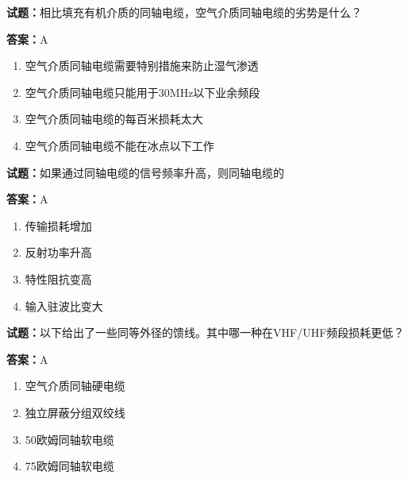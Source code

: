 \documentclass{ctexbook}
\begin{document}




\vspace{1em}

\textbf{试题：}相比填充有机介质的同轴电缆，空气介质同轴电缆的劣势是什么？ 

\textbf{答案：}A 

\begin{enumerate}[leftmargin=3em]
  \item 空气介质同轴电缆需要特别措施来防止湿气渗透 

  \item 空气介质同轴电缆只能用于30MHz以下业余频段 

  \item 空气介质同轴电缆的每百米损耗太大 

  \item 空气介质同轴电缆不能在冰点以下工作 

\end{enumerate}





\vspace{1em}

\textbf{试题：}如果通过同轴电缆的信号频率升高，则同轴电缆的 

\textbf{答案：}A 

\begin{enumerate}[leftmargin=3em]
  \item 传输损耗增加 

  \item 反射功率升高 

  \item 特性阻抗变高 

  \item 输入驻波比变大 

\end{enumerate}





\vspace{1em}

\textbf{试题：}以下给出了一些同等外径的馈线。其中哪一种在VHF/UHF频段损耗更低？ 

\textbf{答案：}A 

\begin{enumerate}[leftmargin=3em]
  \item 空气介质同轴硬电缆 

  \item 独立屏蔽分组双绞线 

  \item 50欧姆同轴软电缆 

  \item 75欧姆同轴软电缆 

\end{enumerate}
\end{document}
